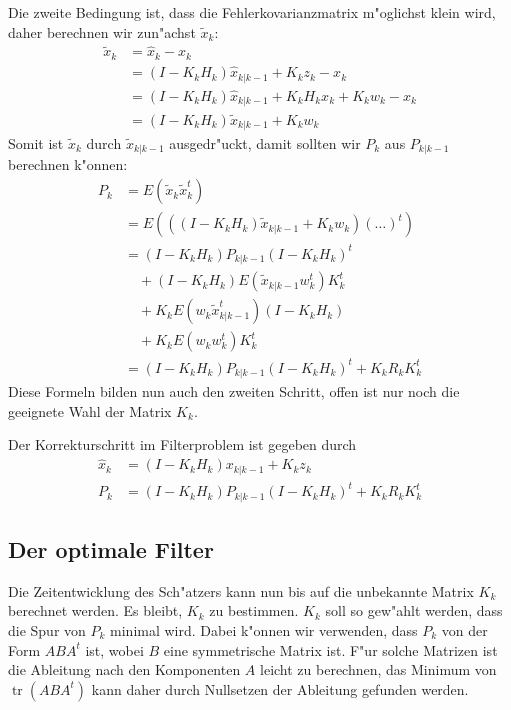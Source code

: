 Die zweite Bedingung ist, dass die Fehlerkovarianzmatrix m"oglichst klein wird,
daher berechnen wir zun"achst $\tilde x_{k}$:
\begin{align*}
\tilde x_{k}&=\hat x_{k}-x_{k}\\
&=(I-K_{k}H_{k})\hat x_{k|k-1}+K_{k}z_{k}-x_{k}\\
&=(I-K_{k}H_{k})\hat x_{k|k-1}+K_{k}H_{k}x_{k}+K_{k}w_k-x_{k}\\
&=(I-K_{k}H_{k})\tilde x_{k|k-1}+K_{k}w_k
\end{align*}
Somit ist $\tilde x_{k}$ durch $\tilde x_{k|k-1}$ ausgedr"uckt, damit sollten
wir $P_{k}$ aus $P_{k|k-1}$ berechnen k"onnen:
\begin{align*}
P_{k}&=E(\tilde x_{k}\tilde x_{k}^t)\\
&=E(
((I-K_{k}H_{k})\tilde x_{k|k-1}+K_{k}w_k)
(\dots)^t
)\\
&=(I-K_{k}H_{k})P_{k|k-1}(I-K_{k}H_{k})^t\\
&\quad +(I-K_{k}H_{k})E(\tilde x_{k|k-1}w_k^t)K_{k}^t\\
&\quad+K_{k}E(w_k\tilde x_{k|k-1}^t)(I-K_{k}H_{k})\\
&\quad+K_{k}E(w_kw_k^t)K_{k}^t\\
&=(I-K_{k}H_{k})P_{k|k-1}(I-K_{k}H_{k})^t +K_{k}R_kK_{k}^t
\end{align*}
Diese Formeln bilden nun auch den zweiten Schritt, offen ist nur noch die
geeignete Wahl der Matrix $K_{k}$.
\begin{definition}
Der Korrekturschritt im Filterproblem ist gegeben durch
\begin{align}
\hat x_{k}&=(I-K_{k}H_{k})x_{k|k-1}+K_{k}z_{k} \label{estimate-correction}\\
P_{k} &=(I-K_{k}H_{k})P_{k|k-1}(I-K_{k}H_{k})^t +K_{k}R_kK_{k}^t \label{covariance-correction}
\end{align}
\end{definition}

\subsection{Der optimale Filter}
Die Zeitentwicklung des Sch"atzers kann nun bis auf die unbekannte Matrix $K_k$
berechnet werden.
Es bleibt, $K_k$ zu bestimmen.
$K_k$ soll so gew"ahlt werden,
dass die Spur von $P_{k}$ minimal wird.
Dabei k"onnen wir verwenden,
dass $P_{k}$ von der Form $ABA^t$ ist, wobei $B$ eine symmetrische
Matrix ist.
F"ur solche Matrizen ist die Ableitung nach den Komponenten
$A$ leicht zu berechnen, das Minimum von $\operatorname{tr}(ABA^t)$
kann daher durch Nullsetzen der Ableitung gefunden werden.

